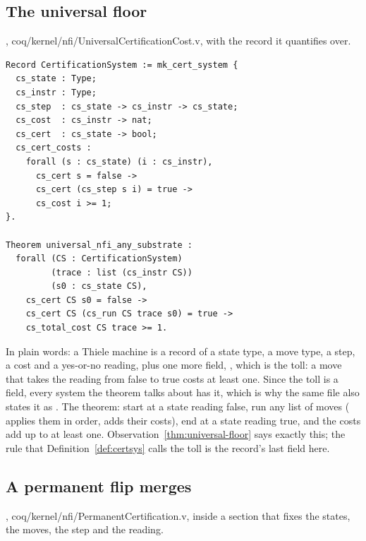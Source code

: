 \subsection{The universal floor}

{\raggedright {}, coq/kernel/nfi/UniversalCertificationCost.v, with the record it quantifies over.\par}

{\footnotesize
\begin{verbatim}
Record CertificationSystem := mk_cert_system {
  cs_state : Type;
  cs_instr : Type;
  cs_step  : cs_state -> cs_instr -> cs_state;
  cs_cost  : cs_instr -> nat;
  cs_cert  : cs_state -> bool;
  cs_cert_costs :
    forall (s : cs_state) (i : cs_instr),
      cs_cert s = false ->
      cs_cert (cs_step s i) = true ->
      cs_cost i >= 1;
}.

Theorem universal_nfi_any_substrate :
  forall (CS : CertificationSystem)
         (trace : list (cs_instr CS))
         (s0 : cs_state CS),
    cs_cert CS s0 = false ->
    cs_cert CS (cs_run CS trace s0) = true ->
    cs_total_cost CS trace >= 1.
\end{verbatim}}

In plain words: a Thiele machine is a record of a state type, a move type, a step, a
cost and a yes-or-no reading, plus one more field, , which is the toll: a
move that takes the reading from false to true costs at least one. Since the toll is a field,
every system the theorem talks about has it, which is why the same file also states it as
. The theorem: start at a state reading false, run
any list of moves ( applies them in order,  adds their
costs), end at a state reading true, and the costs add up to at least one.
Observation~\ref{thm:universal-floor} says exactly this; the rule that Definition~\ref{def:certsys}
calls the toll is the record's last field here.

\subsection{A permanent flip merges}

{\raggedright {}, coq/kernel/nfi/PermanentCertification.v, inside a section that fixes the states, the moves, the step and the reading.\par}

